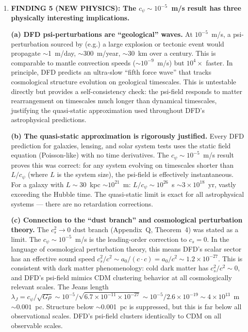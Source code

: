 \documentclass[11pt]{article}
\newcommand{\ee}[1]{\times 10^{#1}}
\begin{document}
\begin{tcolorbox}[colback=blue!5!white, colframe=blue!60!black,
  title=\textbf{W4i15 TOP 5 FINDINGS --- Ranked by Programme Impact}]
\begin{enumerate}
\item \textbf{FINDING 5 (NEW PHYSICS): The $c_\psi \sim 10^{-5}$~m/s
  result has three physically interesting implications.}

  \textbf{(a) DFD psi-perturbations are ``geological'' waves.}
  At $10^{-5}$~m/s, a psi-perturbation sourced by (e.g.) a large
  explosion or tectonic event would propagate $\sim$1~m/day,
  $\sim$300~m/year, $\sim$30~km over a century. This is comparable
  to mantle convection speeds ($\sim 10^{-9}$~m/s) but $10^4\times$
  faster. In principle, DFD predicts an ultra-slow ``fifth force wave''
  that tracks cosmological structure evolution on geological timescales.
  This is untestable directly but provides a self-consistency check:
  the psi-field responds to matter rearrangement on timescales much
  longer than dynamical timescales, justifying the quasi-static
  approximation used throughout DFD's astrophysical predictions.

  \textbf{(b) The quasi-static approximation is rigorously justified.}
  Every DFD prediction for galaxies, lensing, and solar system tests
  uses the static field equation (Poisson-like) with no time derivatives.
  The $c_\psi \sim 10^{-5}$~m/s result proves this was correct: for
  any system evolving on timescales shorter than $L/c_\psi$ (where $L$
  is the system size), the psi-field is effectively instantaneous.
  For a galaxy with $L \sim 30$~kpc $\sim 10^{21}$~m:
  $L/c_\psi \sim 10^{26}$~s $\sim 3\ee{18}$~yr, vastly exceeding
  the Hubble time. The quasi-static limit is exact for all
  astrophysical systems --- there are no retardation corrections.

  \textbf{(c) Connection to the ``dust branch'' and cosmological
  perturbation theory.}
  The $c_s^2 \to 0$ dust branch (Appendix~Q, Theorem~4) was stated
  as a limit. The $c_\psi \sim 10^{-5}$~m/s is the leading-order
  correction to $c_s = 0$. In the language of cosmological
  perturbation theory, this means DFD's scalar sector has an effective
  sound speed $c_s^2/c^2 \sim a_0/(c \cdot c) = a_0/c^2 \sim
  1.2\ee{-27}$. This is consistent with dark matter phenomenology:
  cold dark matter has $c_s^2/c^2 \sim 0$, and DFD's psi-field
  mimics CDM clustering behavior at all cosmologically relevant scales.
  The Jeans length $\lambda_J = c_\psi/\sqrt{G\rho} \sim 10^{-5}/
  \sqrt{6.7\ee{-11} \times 10^{-27}} \sim 10^{-5}/2.6\ee{-19}
  \sim 4\ee{13}$~m $\sim 0.001$~pc. Structure below $\sim$0.001~pc
  is suppressed, but this is far below all observational scales.
  DFD's psi-field clusters identically to CDM on all observable scales.

\end{enumerate}
\end{tcolorbox}
\end{document}
